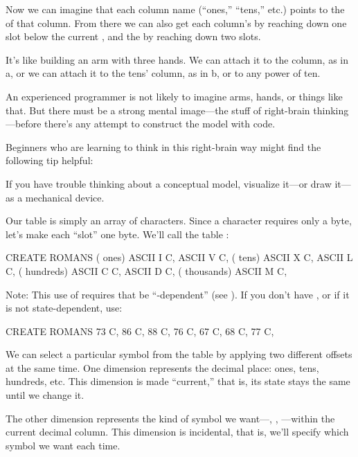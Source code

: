 \noindent Now we can imagine that each column name (``ones,'' ``tens,''
etc.) points to the  of that column. From there we can also
get each column's  by reaching down one slot below the
current , and the  by reaching down two slots.

It's like building an arm with three hands. We can attach it to the
 column, as in a, or we can attach it to the tens'
column, as in b, or to any power of ten.



An experienced \Forth{} programmer is not likely to imagine arms,
hands, or things like that. But there must be a strong mental image---the
stuff of right-brain thinking---before there's any attempt to construct the
model with code.

Beginners who are learning to think in this right-brain way might
find the following tip helpful:

\begin{tip}
If you have trouble thinking about a conceptual model,
visualize it---or draw it---as a mechanical device.
\end{tip}
Our table is simply an array of characters. Since a character requires
only a byte, let's make each ``slot'' one byte. We'll call the table
:

\begin{Code}
CREATE ROMANS    ( ones)  ASCII I  C,   ASCII V  C,
                 ( tens)  ASCII X  C,   ASCII L  C,
             ( hundreds)  ASCII C  C,   ASCII D  C,
            ( thousands)  ASCII M  C,
\end{Code}
Note: This use of  requires that  be
``-dependent'' (see ). If you don't have ,
or if it is not state-dependent, use:

\begin{Code}
CREATE ROMANS  73 C,  86 C,  88 C,  76 C,
   67 C,  68 C,  77 C,
\end{Code}
We can select a particular symbol from the table by applying two
different offsets at the same time. One dimension represents the decimal
place: ones, tens, hundreds, etc. This dimension is made ``current,'' that
is, its state stays the same until we change it.

The other dimension represents the kind of symbol we want---,
, ---within the current decimal column. This
dimension is incidental, that is, we'll specify which symbol we want each
time.

